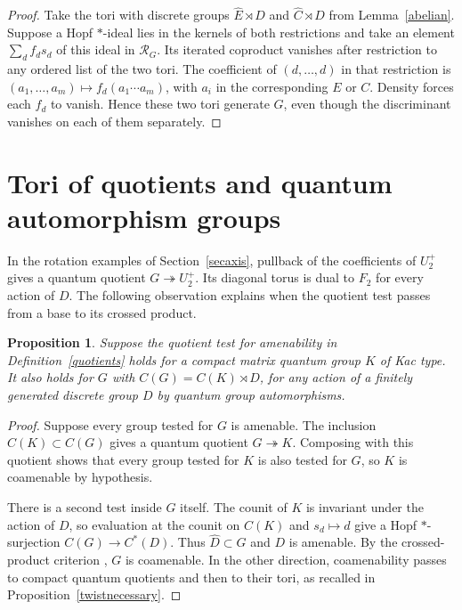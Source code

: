 \documentclass[11pt,a4paper]{article}
\newtheorem{prop}[thm]{Proposition}
\theoremstyle{remark}
\begin{document}
\begin{proof}
Take the tori with discrete groups $\widehat E\rtimes D$ and
$\widehat C\rtimes D$ from Lemma~\ref{abelian}. Suppose a Hopf
$*$-ideal lies in the kernels of both restrictions and take an element
$\sum_d f_ds_d$ of this ideal in $\mathcal R_G$. Its iterated
coproduct vanishes after restriction to any ordered list of the two
tori. The coefficient of $(d,\ldots,d)$ in that restriction is
$(a_1,\ldots,a_m)\mapsto f_d(a_1\cdots a_m)$, with $a_i$ in the
corresponding $E$ or $C$. Density forces each $f_d$ to vanish. Hence
these two tori generate $G$, even though the discriminant vanishes on
each of them separately.
\end{proof}

\section{Tori of quotients and quantum automorphism groups}\label{secquotients}

In the rotation examples of Section~\ref{secaxis}, pullback of the
coefficients of $U_2^+$ gives a quantum quotient
$G\twoheadrightarrow U_2^+$. Its diagonal torus is dual to $F_2$ for
every action of $D$. The following observation explains when
the quotient test passes from a base to its crossed product.
\begin{prop}\label{permanence}
Suppose the quotient test for amenability in Definition~\ref{quotients} holds
for a compact matrix quantum group $K$ of Kac type. It also holds for
$G$ with $C(G)=C(K)\rtimes D$, for any action of a finitely
generated discrete group $D$ by quantum group automorphisms.
\end{prop}
\begin{proof}
Suppose every group tested for $G$ is amenable. The inclusion
$C(K)\subset C(G)$ gives a quantum quotient $G\twoheadrightarrow K$.
Composing with this quotient shows that every group tested for $K$ is
also tested for $G$, so $K$ is coamenable by hypothesis.

There is a second test inside $G$ itself. The counit of $K$ is invariant
under the action of $D$, so evaluation at the counit on $C(K)$ and
$s_d\mapsto d$ give a Hopf $*$-surjection $C(G)\to C^*(D)$.
Thus $\widehat D\subset G$ and $D$ is amenable. By the crossed-product
criterion \cite[Corollary~6.4]{fmp}, $G$ is coamenable. In the
other direction, coamenability passes to compact quantum quotients
and then to their tori, as recalled in Proposition~\ref{twistnecessary}.
\end{proof}
\end{document}
